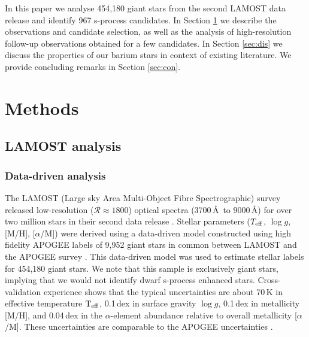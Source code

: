 \documentclass[a4paper,fleqn,usenatbib]{mnras}
\begin{document}
In this paper we analyse 454,180 giant stars from the second LAMOST data release \citep{luo2015} and identify 967 s-process candidates. In Section \ref{sec:methods} we describe the observations and candidate selection, as well as the analysis of high-resolution follow-up observations obtained for a few candidates. In Section \ref{sec:dis} we discuss the properties of our barium stars in context of existing literature. We provide concluding remarks in Section \ref{sec:con}.

\section{Methods} \label{sec:methods}
\subsection{LAMOST analysis}
\subsubsection{Data-driven analysis}
The LAMOST (Large sky Area Multi-Object Fibre Spectrographic) survey released low-resolution ($\mathcal{R} \approx 1800$) optical spectra (3700\,\AA\ to 9000\,\AA) for over two million stars in their second data release \citep{luo2015}. Stellar parameters ($T_{\rm eff}$, $\log{g}$, [M/H], [$\alpha$/M]) were derived using a data-driven model constructed using high fidelity APOGEE labels of 9,952 giant stars in common between LAMOST and the APOGEE survey \citep{ho2017}. This data-driven model was used to estimate stellar labels for 454,180 giant stars. We note that this sample is exclusively giant stars, implying that we would not identify dwarf s-process enhanced stars. Cross-validation experience shows that the typical uncertainties are about 70\,K in effective temperature $\rm T_{\rm eff}$, 0.1\,dex in surface gravity $\log{g}$, 0.1\,dex in metallicity [M/H], and 0.04\,dex in the $\alpha$-element abundance relative to overall metallicity [$\alpha$/M]. These uncertainties are comparable to the APOGEE uncertainties \citep{alam2015}.
\end{document}
